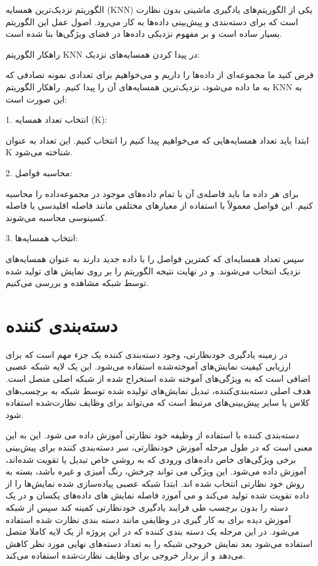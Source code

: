 الگوریتم نزدیک‌ترین همسایه (KNN) یکی از الگوریتم‌های یادگیری ماشینی بدون نظارت است که برای دسته‌بندی و پیش‌بینی داده‌ها به کار می‌رود. اصول عمل این الگوریتم بسیار ساده است و بر مفهوم نزدیکی داده‌ها در فضای ویژگی‌ها بنا شده است.

راهکار الگوریتم KNN در پیدا کردن همسایه‌های نزدیک:

فرض کنید ما  مجموعه‌ای از داده‌ها را داریم و می‌خواهیم برای تعدادی نمونه تصادفی که به ما داده می‌شود، نزدیک‌ترین همسایه‌های آن را پیدا کنیم. راهکار الگوریتم KNN به این صورت است:

1. انتخاب تعداد همسایه (K):

ابتدا باید تعداد همسایه‌هایی که می‌خواهیم پیدا کنیم را انتخاب کنیم. این تعداد به عنوان K شناخته می‌شود.

2. محاسبه فواصل:

 برای هر داده ما باید فاصله‌ی آن با تمام داده‌های موجود در مجموعه‌داده را محاسبه کنیم. این فواصل معمولاً با استفاده از معیارهای مختلفی مانند فاصله اقلیدسی یا فاصله کسینوسی محاسبه می‌شوند.

3. انتخاب همسایه‌ها:

سپس تعداد همسایه‌ای که کمترین فواصل را با داده جدید دارند به عنوان همسایه‌های نزدیک انتخاب می‌شوند.
  و در نهایت نتیجه الگوریتم را بر روی نمایش های تولید شده توسط شبکه مشاهده و بررسی می‌کنیم.





\section{دسته‌بندی کننده}



در زمینه یادگیری خودنظارتی، وجود دسته‌بندی کننده یک جزء مهم است که برای ارزیابی کیفیت نمایش‌های آموخته‌شده استفاده می‌شود. این یک لایه شبکه عصبی اضافی است که به ویژگی‌های آموخته شده استخراج شده از شبکه  اصلی متصل است. هدف اصلی دسته‌بندی‌کننده، تبدیل نمایش‌های تولیده شده توسط شبکه به برچسب‌های کلاس یا سایر پیش‌بینی‌های مرتبط است که می‌تواند برای وظایف نظارت‌شده استفاده شود.

 دسته‌بندی کننده با استفاده از وظیفه خود نظارتی آموزش داده می شود. این به این معنی است که در طول مرحله آموزش خود‌‌نظارتی، سر دسته‌بندی کننده برای پیش‌بینی برخی ویژگی‌های خاص داده‌های ورودی که به روشی خاص تبدیل یا تقویت شده‌اند، آموزش داده می‌شود. این ویژگی می تواند چرخش، رنگ آمیزی و غیره باشد، بسته به روش خود نظارتی انتخاب شده اند. 
 ابتدا شبکه عصبی پیاده‌سازی شده نمایش‌ها را از داده تقویت شده تولید می‌کند و می آموزد فاصله نمایش های داده‌های یکسان و در یک دسته را بدون برچسب طی فرایند یادگیری خودنظارتی کمینه کند سپس از شبکه آموزش دیده برای به کار گیری در وظایفی مانند دسته بندی نظارت شده استفاده می‌شود. در این مرحله یک دسته بندی کننده که در این پروژه از یک لایه کاملا متصل استفاده می‌شود  بعد نمایش خروجی شبکه را به تعداد دسته‌های نهایی مورد نظر کاهش می‌دهد و از بردار خروجی برای وظایف نظارت‌شده استفاده ‌می‌کند.

